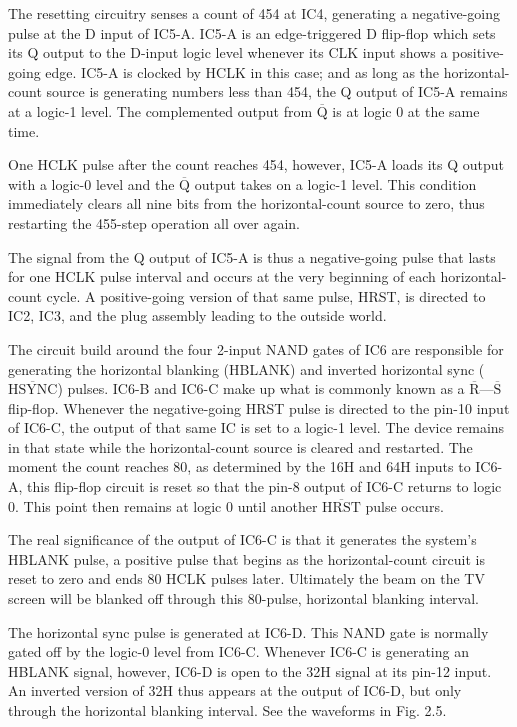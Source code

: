 \documentclass[11pt]{book}              %
\newcommand{\NOT}[1]{$\overline{\mbox{#1}}$}
\begin{document}
The resetting circuitry senses a count of 454 at IC4, generating a negative-going pulse at the D input of IC5-A. IC5-A is an edge-triggered D flip-flop which sets its Q output to the D-input logic level whenever its CLK input shows a positive-going edge. IC5-A is clocked by HCLK in this case; and as long as the horizontal-count source is generating numbers less than 454, the Q output of IC5-A remains at a logic-1 level. The complemented output from \NOT{Q} is at logic 0 at the same time.

One HCLK pulse after the count reaches 454, however, IC5-A loads its Q output with a logic-0 level and the \NOT{Q} output takes on a logic-1 level. This condition immediately clears all nine bits from the horizontal-count source to zero, thus restarting the 455-step operation all over again.

The signal from the Q output of IC5-A is thus a negative-going pulse that lasts for one HCLK pulse interval and occurs at the very beginning of each horizontal-count cycle. A positive-going version of that same pulse, HRST, is directed to IC2, IC3, and the plug assembly leading to the outside world.

The circuit build around the four 2-input NAND gates of IC6 are responsible for generating the horizontal blanking (HBLANK) and inverted horizontal sync (\NOT{HSYNC}) pulses. IC6-B and IC6-C make up what is commonly known as a \NOT{R}—\NOT{S} flip-flop. Whenever the negative-going HRST pulse is directed to the pin-10 input of IC6-C, the output of that same IC is set to a logic-1 level. The device remains in that state while the horizontal-count source is cleared and restarted. The moment the count reaches 80, as determined by the 16H and 64H inputs to IC6-A, this flip-flop circuit is reset so that the pin-8 output of IC6-C returns to logic 0. This point then remains at logic 0 until another \NOT{HRST} pulse occurs.

The real significance of the output of IC6-C is that it generates the system’s HBLANK pulse, a positive pulse that begins as the horizontal-count circuit is reset to zero and ends 80 HCLK pulses later. Ultimately the beam on the TV screen will be blanked off through this 80-pulse, horizontal blanking interval.

The horizontal sync pulse is generated at IC6-D. This NAND gate is normally gated off by the logic-0 level from IC6-C. Whenever IC6-C is generating an HBLANK signal, however, IC6-D is open to the 32H signal at its pin-12 input. An inverted version of 32H thus appears at the output of IC6-D, but only through the horizontal blanking interval. See the waveforms in Fig. 2.5.
\end{document}
